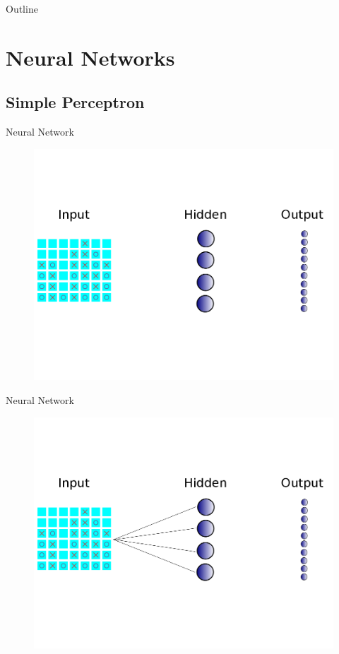 


\begin{frame}[plain] 
\titlepage
\end{frame}

\begin{frame}[plain]{Outline}
\tableofcontents
\end{frame}

\section{Neural Networks}
\subsection{Simple Perceptron}

\begin{frame}[plain]{Neural Network}
\begin{figure}
\includegraphics[width = 0.8 \textwidth]{"simple neural net no lines"}
\end{figure}
\end{frame}


\begin{frame}[plain]{Neural Network}
\begin{figure}
\includegraphics[width = 0.8 \textwidth]{"simple neural net half lines"}
\end{figure}
\end{frame}


